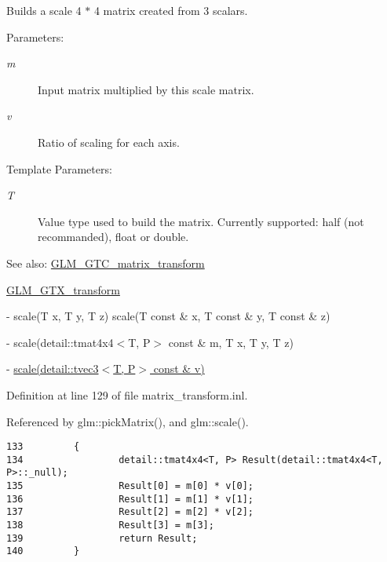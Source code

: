 Builds a scale 4 $\ast$ 4 matrix created from 3 scalars.

\begin{Desc}
\item[Parameters:]
\begin{description}
\item[{\em m}]Input matrix multiplied by this scale matrix. \item[{\em v}]Ratio of scaling for each axis. \end{description}
\end{Desc}
\begin{Desc}
\item[Template Parameters:]
\begin{description}
\item[{\em T}]Value type used to build the matrix. Currently supported: half (not recommanded), float or double. \end{description}
\end{Desc}
\begin{Desc}
\item[See also:]\hyperlink{group__gtc__matrix__transform}{GLM\_\-GTC\_\-matrix\_\-transform} 

\hyperlink{group__gtx__transform}{GLM\_\-GTX\_\-transform} 

- scale(T x, T y, T z) scale(T const \& x, T const \& y, T const \& z) 

- scale(detail::tmat4x4$<$T, P$>$ const \& m, T x, T y, T z) 

- \hyperlink{group__gtx__transform_g70f2d33f150672b9faca3b477fcca2c4}{scale(detail::tvec3$<$T, P$>$ const \& v)} \end{Desc}


Definition at line 129 of file matrix\_\-transform.inl.

Referenced by glm::pickMatrix(), and glm::scale().

\begin{Code}\begin{verbatim}133         {
134                 detail::tmat4x4<T, P> Result(detail::tmat4x4<T, P>::_null);
135                 Result[0] = m[0] * v[0];
136                 Result[1] = m[1] * v[1];
137                 Result[2] = m[2] * v[2];
138                 Result[3] = m[3];
139                 return Result;
140         }
\end{verbatim}
\end{Code}




